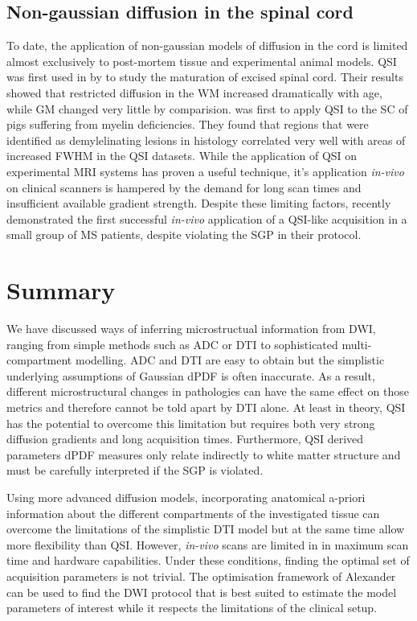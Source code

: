 \subsection{Non-gaussian diffusion in the spinal cord}
To date, the application of non-gaussian models of diffusion in the cord is limited almost exclusively to post-mortem tissue and experimental animal models. \Gls{QSI} was first used in by \citet{Assaf:2000} to study the maturation of excised spinal cord. Their results showed that restricted diffusion in the \gls{WM} increased dramatically with age, while \gls{GM} changed very little by comparision.  was first to apply \gls{QSI} to the \gls{SC} of pigs suffering from myelin deficiencies. They found that regions that were identified as demylelinating lesions in histology correlated very well with areas of increased \gls{FWHM} in the \gls{QSI} datasets. While the application of \gls{QSI} on experimental MRI systems has proven a useful technique, it's application \emph{in-vivo} on clinical scanners is hampered by the demand for long scan times and insufficient available gradient strength. Despite these limiting factors, \citet{Farrell:2008} recently demonstrated the first successful \emph{in-vivo} application of a \gls{QSI}-like acquisition in a small group of \gls{MS} patients, despite violating the \gls{SGP} in their protocol. 

 
\section{Summary}
We have discussed ways of inferring microstructual information from  {\gls{DWI}}, ranging from simple methods such as \gls{ADC} or \gls{DTI} to sophisticated multi-compartment modelling. \gls{ADC} and \gls{DTI} are easy to obtain but the simplistic underlying assumptions of Gaussian  {\gls{dPDF}} is often inaccurate. As a result, different microstructural changes in pathologies can have the same effect on those metrics and therefore cannot be told apart by \gls{DTI} alone. At least in theory, \gls{QSI} has the potential to overcome this limitation but requires both very strong diffusion gradients and long acquisition times. Furthermore, \gls{QSI} derived parameters  {\gls{dPDF}} measures only relate indirectly to white matter structure and must be carefully interpreted if the SGP is violated.


Using more advanced diffusion models, incorporating anatomical a-priori information about the different compartments of the investigated tissue can overcome the limitations of the simplistic \gls{DTI} model but at the same time allow more flexibility than \gls{QSI}. However, \emph{in-vivo} scans are limited in in maximum scan time and hardware capabilities. Under these conditions, finding the optimal set of acquisition parameters is not trivial. The optimisation framework of Alexander can be used to find the  {\gls{DWI}}  protocol that is best suited to estimate the model parameters of interest while it respects the limitations of the clinical setup.  


